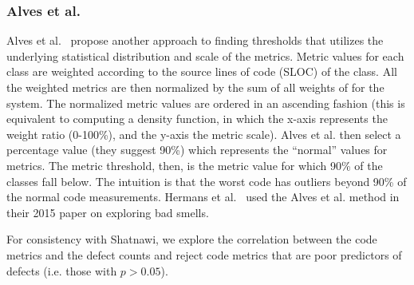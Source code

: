 \documentclass[twocolumn,5p]{elsarticle}
\theoremstyle{break}
\begin{document}
 
\subsubsection{ Alves et al.}
Alves et al.~\cite{Alves2010} propose another approach
to finding thresholds that  utilizes the underlying statistical distribution and scale of the metrics. 
Metric values for each class are weighted according to the source lines of code (SLOC) of the class. All the weighted metrics are then normalized by the sum of all weights of for the system. 
The normalized metric values are ordered in an ascending fashion (this is equivalent to computing a density function, in which the x-axis represents the weight ratio (0-100\%), and the y-axis the metric scale).
Alves et al. then select a percentage value (they suggest 90\%) which represents the ``normal'' values for metrics. The metric threshold, then, is the metric value for which 90\% of the classes fall below. The intuition  is that the worst code has outliers beyond 90\% of the normal code measurements. Hermans et al.~\cite{hermans15} used the
Alves et al. method in their  2015 paper on
exploring bad smells.

For consistency
with Shatnawi, we explore the correlation between
the code metrics and the defect counts and   reject code metrics that are poor predictors of defects (i.e.   those  with $p > 0.05$).
\end{document}
